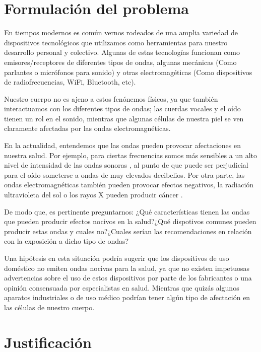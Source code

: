 \documentclass[spanish,notitlepage,letterpaper, 12pt]{article}
\begin{document}

\tableofcontents

\newpage

\section{Formulación del problema}
En tiempos modernos es común vernos rodeados de una amplia variedad de dispositivos tecnológicos que utilizamos como herramientas para nuestro desarrollo personal y colectivo. Algunas de estas tecnologías funcionan como emisores/receptores de diferentes tipos de ondas, algunas mecánicas (Como
parlantes o micrófonos para sonido) y otras
electromagéticas (Como dispositivos de radiofrecuencias, WiFi, Bluetooth, etc).\par
\bigskip
Nuestro cuerpo no es ajeno a estos fenónemos físicos, ya que también interactuamos con los diferentes tipos de ondas; las cuerdas vocales y el oído tienen un rol en el sonido, mientras que algunas células de nuestra piel se ven claramente afectadas por las ondas electromagnéticas. \cite{IDEAM}\par
\bigskip
En la actualidad, entendemos que las ondas pueden provocar afectaciones en nuestra salud.  Por ejemplo, para ciertas frecuencias somos más sensibles a un alto nivel de intensidad de las ondas sonoras \cite{serway_jewett_2017}, al punto de que puede ser perjudicial para el oído someterse a ondas de
muy elevados decibelios. Por otra parte, las ondas electromagnéticas también pueden provocar efectos negativos, la radiación ultravioleta del sol o los rayos X pueden producir cáncer \cite{Wall2006-pi}.\par
\bigskip
De modo que, es pertinente preguntarnos: ¿Qué características tienen las ondas que pueden producir efectos nocivos en la salud?¿Qué dispotivos comunes pueden producir estas ondas y cuales no?¿Cuales serían las recomendaciones en relación con la exposición a dicho tipo de ondas?\par
\bigskip
Una hipótesis en esta situación podría sugerir que los dispositivos de uso doméstico no emiten ondas nocivas para la salud, ya que no existen impetuosas advertencias sobre el uso de estos dispositivos por parte de los fabricantes o una opinión consensuada por especialistas en salud. Mientras que
quizás algunos aparatos industriales o de uso médico podrían tener algún tipo de afectación en las células de nuestro cuerpo.
\section{Justificación}
\end{document}
